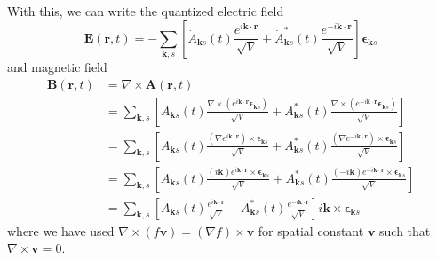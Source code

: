 \documentclass[../../../main.tex]{subfiles}
\begin{document}
With this, we can write the  quantized electric field
\begin{equation*}
  \mathbf{E}(\mathbf{r}, t) = -\sum_{\mathbf{k},s} \left[ \dot{A}_{\mathbf{k}s}(t)\frac{e^{i \mathbf{\mathbf{k}} \cdot \mathbf{r}}}{\sqrt{V}} + \dot{A}_{\mathbf{k}s}^*(t)\frac{e^{-i \mathbf{\mathbf{k}} \cdot \mathbf{r}}}{\sqrt{V}} \right] \boldsymbol{\epsilon}_{\mathbf{k}s}
\end{equation*}
and magnetic field
\begin{align*}
  \mathbf B(\mathbf r,t)
   & = \nabla \times \mathbf A(\mathbf r,t) \\
   & = \sum_{\mathbf k,s}
  \left[
    A_{\mathbf k s}(t)\frac{\nabla \times \left(e^{i\mathbf k\cdot\mathbf r}\boldsymbol{\epsilon}_{\mathbf k s}\right)}{\sqrt V}
    + A_{\mathbf k s}^*(t)\frac{\nabla \times \left(e^{-i\mathbf k\cdot\mathbf r}\boldsymbol{\epsilon}_{\mathbf k s}\right)}{\sqrt V}
  \right]                                   \\
   & = \sum_{\mathbf k,s}
  \left[
    A_{\mathbf k s}(t)\frac{(\nabla e^{i\mathbf k\cdot\mathbf r})\times\boldsymbol{\epsilon}_{\mathbf k s}}{\sqrt V}
    + A_{\mathbf k s}^*(t)\frac{(\nabla e^{-i\mathbf k\cdot\mathbf r})\times\boldsymbol{\epsilon}_{\mathbf k s}}{\sqrt V}
  \right]                                   \\
   & = \sum_{\mathbf k,s}
  \left[
    A_{\mathbf k s}(t)\frac{(i\mathbf k)e^{i\mathbf k\cdot\mathbf r}\times\boldsymbol{\epsilon}_{\mathbf k s}}{\sqrt V}
    + A_{\mathbf k s}^*(t)\frac{(-i\mathbf k)e^{-i\mathbf k\cdot\mathbf r}\times\boldsymbol{\epsilon}_{\mathbf k s}}{\sqrt V}
  \right]                                   \\
   & = \sum_{\mathbf k,s}
  \left[ A_{\mathbf{k } s}(t)\frac{e^{i \mathbf{k} \cdot \mathbf{r}}}{\sqrt{V}} - A_{\mathbf{k } s}^*(t)\frac{e^{-i \mathbf{k} \cdot \mathbf{r}}}{\sqrt{V}} \right]
  i\mathbf k \times \boldsymbol{\epsilon}_{\mathbf k s}
\end{align*}
where we have used $\nabla \times (f \mathbf{v}) = (\nabla f) \times \mathbf{v}$ for spatial constant $\mathbf{v}$ such that $\nabla  \times \mathbf{v}=0$.
\end{document}
